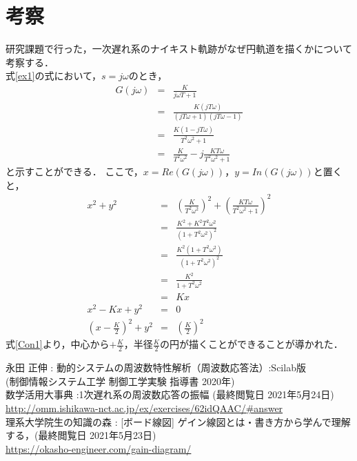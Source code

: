 \documentclass[a4paper,11pt]{jsarticle}
\begin{document}
\section{考察}
研究課題で行った，一次遅れ系のナイキスト軌跡がなぜ円軌道を描くかについて考察する．\\
式\ref{ex1}の式において，$s=j\omega$のとき，\\
\begin{eqnarray}
  G(j\omega) &=& \frac{K}{j\omega T + 1} \nonumber \\
  &=& \frac{K(jT\omega)}{(jT\omega+1)(jT\omega-1)} \nonumber \\
  &=& \frac{K(1-jT\omega)}{T^2\omega^2+1} \nonumber \\
  &=& \frac{K}{T^2\omega^2}-j\frac{KT\omega}{T^2\omega^2+1}
\end{eqnarray}
と示すことができる．
ここで，$x = Re(G(j\omega))$，$y = In(G(j\omega))$と置くと，
\begin{eqnarray}
  x^2+y^2 &=& {\left(\frac{K}{T^2\omega^2}\right)}^2+{\left(\frac{KT\omega}{T^2\omega^2+1}\right)}^2 \nonumber \\
  &=& \frac{K^2+K^2T^2\omega^2}{(1+T^2\omega^2)^2} \nonumber \\
  &=& \frac{K^2(1+T^2\omega^2)}{(1+T^2\omega^2)^2} \nonumber \\
  &=& \frac{K^2}{1+T^2\omega^2} \nonumber \\
  &=& Kx \nonumber \\
  x^2 -Kx + y^2 &=& 0 \nonumber \\
  {\left(x - \frac{K}{2}\right)}^2  + y^2 &=& {\left(\frac{K}{2}\right)}^2 \label{Con1}
\end{eqnarray}
式\ref{Con1}より，中心から$+\frac{K}{2}$，半径$\frac{K}{2}$の円が描くことができることが導かれた．

\begin{thebibliography}{4}
   永田 正伸 : 動的システムの周波数特性解析（周波数応答法）:Scilab版 \\(制御情報システム工学 制御工学実験 指導書 2020年) \\
   数学活用大事典 :1次遅れ系の周波数応答の振幅 (最終閲覧日 2021年5月24日)\\ \url{http://omm.ishikawa-nct.ac.jp/ex/exercises/62idQAAC/#answer} \\
   理系大学院生の知識の森 : [ボード線図] ゲイン線図とは・書き方から学んで理解する，(最終閲覧日 2021年5月23日) \\\url{https://okasho-engineer.com/gain-diagram/}
\end{thebibliography}
\end{document}
